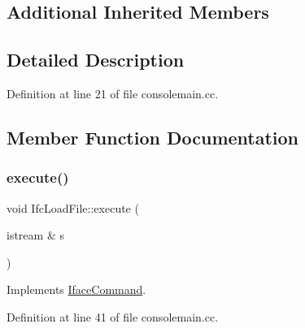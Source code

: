 \subsection*{Additional Inherited Members}


\subsection{Detailed Description}


Definition at line 21 of file consolemain.\+cc.



\subsection{Member Function Documentation}
\mbox{\label{class_ifc_load_file_af7ea7408b40db6c11eff2a4f99f4ef80}} 
\subsubsection{\texorpdfstring{execute()}{execute()}}
{\footnotesize\ttfamily void Ifc\+Load\+File\+::execute (\begin{DoxyParamCaption}\item[{istream \&}]{s }\end{DoxyParamCaption})\hspace{0.3cm}{\ttfamily [virtual]}}



Implements \mbox{\hyperlink{class_iface_command_af10e29cee2c8e419de6efe9e680ad201}{Iface\+Command}}.



Definition at line 41 of file consolemain.\+cc.


